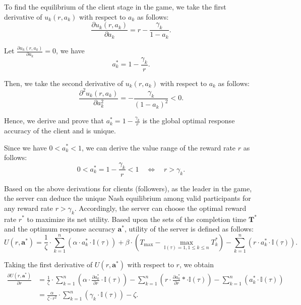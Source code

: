\documentclass[final,1p,times]{elsarticle}
\begin{document}
To find the equilibrium of the client stage in the game, we take the first derivative of $u_k(r,a_k)$ with respect to $a_k$ as follows:
\begin{equation}
	\frac{\partial u_k(r,a_k)}{\partial a_k} = r-\frac{\gamma_k}{1-a_k}.
\end{equation}	

Let $\frac{\partial u_k(r,a_k)}{\partial a_k} = 0$, we have
\begin{equation}\label{eq:a_k_ast}
	a_k^\ast = 1 - \frac{\gamma_k}{r}.
\end{equation}	

Then, we take the second derivative of $u_k(r,a_k)$ with respect to $a_k$ as follows:
\begin{equation}
	\frac{\partial^2 u_k(r,a_k)}{\partial a_k^2} = - \frac{\gamma_k}{(1-a_k)^2} < 0.
\end{equation}	

Hence, we derive and prove that $a_k^\ast = 1 - \frac{\gamma_k}{r}$ is the global optimal response accuracy of the client and is unique.

Since we have $0<a_k^\ast<1$, we can derive the value range of the reward rate $r$ as follows:
\begin{equation}
	0 < a_k^\ast = 1 - \frac{\gamma_k}{r} < 1\quad
	\Leftrightarrow\quad r > \gamma_k.
\end{equation}	

Based on the above derivations for clients (followers), as the leader in the game, the server can deduce the unique Nash equilibrium among valid participants for any reward rate $r>\gamma_k$. Accordingly, the server can choose the optimal reward rate $r^\ast$ to maximize its net utility. Based upon the sets of the completion time $\bm{T}^\ast$ and the optimum response accuracy $\bm{a}^\ast$, utility of the server is defined as follows:
\begin{equation}\label{eq:opt_u}
	U(r,\bm{a}^\ast) = \frac{1}{\zeta}\cdot \sum_{k=1}^n(\alpha\cdot a_k^\ast\cdot \mathbb{I}(\tau)) + \beta\cdot(T_{\max}-\max_{\mathbb{I}(\tau)=1,1\le k\le n}T_k^\ast) - \sum_{k=1}^n(r\cdot a_k^\ast\cdot \mathbb{I}(\tau)).
\end{equation}

Taking the first derivative of $U(r,\bm{a}^\ast)$ with respect to $r$, we obtain
\begin{equation}
	\begin{aligned}
		\frac{\partial U(r,\bm{a}^\ast)}{\partial r} &= \frac{1}{\zeta}\cdot \sum_{k=1}^n\left(\alpha\cdot \frac{\partial a_k^\ast}{\partial r}\cdot \mathbb{I}(\tau)\right) - \sum_{k=1}^n\left(r\cdot \frac{\partial a_k^\ast}{\partial r}\ast\cdot \mathbb{I}(\tau)\right) - \sum_{k=1}^n(a_k^\ast\cdot \mathbb{I}(\tau))\\&= \frac{\alpha}{\zeta\cdot r^2}\cdot\sum_{k=1}^n(\gamma_k\cdot\mathbb{I}(\tau))-\zeta.
	\end{aligned}
\end{equation}
\end{document}
